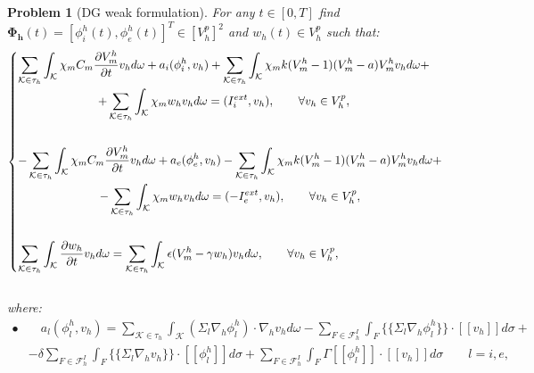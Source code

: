 \documentclass[a4paper,11pt]{article}
\newtheorem{problem}{Problem}
\begin{document}
    \begin{problem}[DG weak formulation]
    For any $t\in[0,T]$ find $\bm{\Phi_h}(t)=[\phi_i^h(t),\phi_e^h(t)]^T \in [V_h^p]^2$  and  $w_h(t) \in V_h^p$ such that:
    \begin{equation*}
    \begin{cases}
    \begin{gathered}
    \sum_{\mathcal{K} \in \tau_h} \int_{\mathcal{K}}{ \chi_m C_m \pdv{V_m^h}{t} v_h d\omega}+a_i(\phi_i^h,v_h)+\sum_{\mathcal{K} \in \tau_h} \int_{\mathcal{K}}{ \chi_m k (V_m^h-1)(V_m^h-a) V_m^h v_h d\omega}+\\
    +\sum_{\mathcal{K} \in \tau_h} \int_{\mathcal{K}}{ \chi_m w_h v_h d\omega}=(I_i^{ext},v_h), \qquad \forall v_h \in V_h^p,\\
    \vspace{2mm}
    \end{gathered}\\
    \begin{gathered}
    -\sum_{\mathcal{K} \in \tau_h} \int_{\mathcal{K}}{ \chi_m C_m \pdv{V_m^h}{t} v_h d\omega}+a_e(\phi_e^h,v_h)-\sum_{\mathcal{K} \in \tau_h} \int_{\mathcal{K}}{ \chi_m k (V_m^h-1)(V_m^h-a) V_m^h v_h d\omega}+\\
    -\sum_{\mathcal{K} \in \tau_h} \int_{\mathcal{K}}{ \chi_m w_h v_h d\omega}=(-I_e^{ext},v_h), \qquad \forall v_h \in V_h^p,\\
       \vspace{2mm}
    \end{gathered}\\
    \displaystyle \sum_{\mathcal{K} \in \tau_h} \int_{\mathcal{K}}{\pdv{w_h}{t}v_h d\omega}=\sum_{\mathcal{K} \in \tau_h} \int_{\mathcal{K}}{\epsilon (V_m^h-\gamma w_h) v_h d\omega}, \qquad \forall v_h \in V_h^p,\\
    \end{cases}
    \end{equation*}
    \vspace{5mm} \\
    where:
    \vspace{3mm}
    \begin{equation}\label{forgamma}
    \begin{aligned}
    \bullet& \quad a_l(\phi_l^h,v_h)=\sum_{\mathcal{K} \in \tau_h} \int_{\mathcal{K}}{(\Sigma_l \nabla_h \phi_l^h) \cdot \nabla_h v_h d\omega}-\sum_{F \in \mathcal{F}_h^I} \int_F { \{\{\Sigma_l \nabla_h \phi_l^h \}\} \cdot [\![v_h]\!] d\sigma}+\\
    &-\delta \sum_{F \in \mathcal{F}_h^I} \int_F{ \{\{\Sigma_l \nabla_h v_h\}\} \cdot [\![\phi_l^h]\!]d\sigma}+\sum_{F \in \mathcal{F}_h^I}\int_F {\Gamma [\![\phi_l^h]\!] \cdot [\![v_h]\!] d\sigma} \qquad l=i,e,\\

\end{aligned}
\end{equation}
\end{problem}
\end{document}
